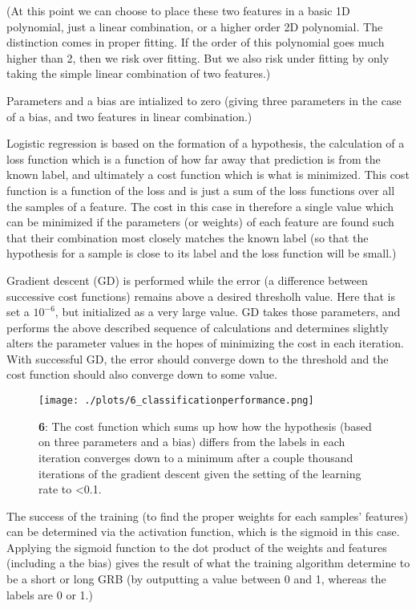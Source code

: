 (At this point we can choose to place these two features in a basic 1D polynomial, just a linear combination, or a higher order 2D polynomial. The distinction comes in proper fitting. If the order of this polynomial goes much higher than 2, then we risk over fitting. But we also risk under fitting by only taking the simple linear combination of two features.)

Parameters and a bias are intialized to zero (giving three parameters in the case of a bias, and two features in linear combination.)

Logistic regression is based on the formation of a hypothesis, the calculation of a loss function which is a function of how far away that prediction is from the known label, and ultimately a cost function which is what is minimized. This cost function is a function of the loss and is just a sum of the loss functions over all the samples of a feature. The cost in this case in therefore a single value which can be minimized if the parameters (or weights) of each feature are found such that their combination most closely matches the known label (so that the hypothesis for a sample is close to its label and the loss function will be small.)

Gradient descent (GD) is performed while the error (a difference between successive cost functions) remains above a desired thresholh value. Here that is set a $10^{-6}$, but initialized as a very large value. GD takes those parameters, and performs the above described sequence of calculations and determines slightly alters the parameter values in the hopes of minimizing the cost in each iteration. With successful GD, the error should converge down to the threshold and the cost function should also converge down to some value.

\begin{figure}[h!]
  \centering
  \texttt{[image: ./plots/6\_classificationperformance.png]}
  \caption{\textbf{6}: The cost function which sums up how how the hypothesis (based on three parameters and a bias) differs from the labels in each iteration converges down to a minimum after a couple thousand iterations of the gradient descent given the setting of the learning rate to <0.1.}
  \label{fig:classificationperformance}
\end{figure}

The success of the training (to find the proper weights for each samples' features) can be determined via the activation function, which is the sigmoid in this case. Applying the sigmoid function to the dot product of the weights and features (including a the bias) gives the result of what the training algorithm determine to be a short or long GRB (by outputting a value between 0 and 1, whereas the labels are 0 or 1.)

